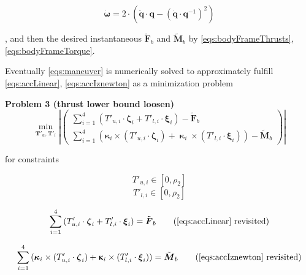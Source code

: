 \documentclass[10pt]{elsarticle}
\begin{document}
\begin{equation} \label{eqs:qdotdotToBeta}
    \boldsymbol{\dot{\omega}} = 2 \cdot ( \boldsymbol{\ddot{q}} \cdot \boldsymbol{q} - (\boldsymbol{\dot{q}} \cdot \boldsymbol{q}^{-1})^2 )  
\end{equation}

, and then the desired instantaneous $\tilde{\boldsymbol{F}}_b$ and $\tilde{\boldsymbol{M}}_b$ by \eqref{eqs:bodyFrameThrusts}, \eqref{eqs:bodyFrameTorque}. 

Eventually \eqref{eqs:maneuver} is numerically solved to approximately fulfill \eqref{eqs:accLinear}, \eqref{eqs:accIznewton} as a minimization problem

\textbf{Problem 3 (thrust lower bound loosen)} \label{prob:p3}
\begin{equation}
\underset{\boldsymbol{T}'_{u}, \boldsymbol{T}'_{l}}{\min} \left| \begin{pmatrix} \sum\limits_{i=1}^{4}{(T'_{u,i} \cdot \boldsymbol{\zeta}_{i} + T'_{l,i} \cdot \boldsymbol{\xi}_{i})} - \tilde{\boldsymbol{F}}_b \\ \sum\limits_{i=1}^{4}{(\boldsymbol{\kappa}_{i} \times (T'_{u,i} \cdot \boldsymbol{\zeta}_{i}) + \boldsymbol{\upkappa}_{i} \times (T'_{l,i} \cdot \boldsymbol{\xi}_{i}))} - \tilde{\boldsymbol{M}}_b \end{pmatrix} \right|
\end{equation}

for constraints 

\begin{equation*}
T'_{u,i} \in [0, \rho_2]
\end{equation*}
\begin{equation*}
T'_{l,i} \in [0, \rho_2]
\end{equation*}

\begin{equation} 
\sum\limits_{i=1}^{4}{(T'_{u,i} \cdot \boldsymbol{\zeta}_{i} + T'_{l,i} \cdot \boldsymbol{\xi}_{i})} = \tilde{\boldsymbol{F}}_b     
\tag{\ref{eqs:accLinear} revisited} %
\end{equation}

\begin{equation} 
\sum\limits_{i=1}^{4}{(\boldsymbol{\kappa}_{i} \times (T'_{u,i} \cdot \boldsymbol{\zeta}_{i}) + \boldsymbol{\upkappa}_{i} \times (T'_{l,i} \cdot \boldsymbol{\xi}_{i}))} = \tilde{\boldsymbol{M}}_b    
\tag{\ref{eqs:accIznewton} revisited} %
\end{equation}
\end{document}
